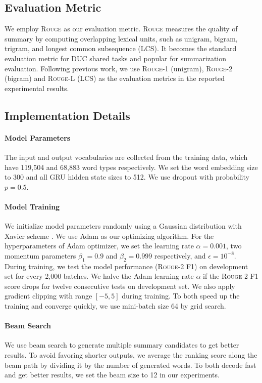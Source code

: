 \documentclass[11pt,a4paper]{article}
\begin{document}
\subsection{Evaluation Metric}
We employ \textsc{Rouge} \citep{lin2004rouge} as our evaluation metric.
\textsc{Rouge} measures the quality of summary by computing overlapping lexical units, such as unigram, bigram, trigram, and longest common subsequence (LCS).
It becomes the standard evaluation metric for DUC shared tasks and popular for summarization evaluation.
Following previous work, we use \textsc{Rouge}-1 (unigram), \textsc{Rouge}-2 (bigram) and \textsc{Rouge}-L (LCS) as the evaluation metrics in the reported experimental results.



\subsection{Implementation Details}

\paragraph{Model Parameters}
The input and output vocabularies are collected from the training data, which have 119,504 and 68,883 word types respectively.
We set the word embedding size to 300 and all GRU hidden state sizes to 512.
We use dropout \citep{srivastava2014dropout} with probability $ p = 0.5 $.


\paragraph{Model Training}
We initialize model parameters randomly using a Gaussian distribution with Xavier scheme \citep{glorot2010understanding}.
We use Adam \citep{kingma2014adam} as our optimizing algorithm.
For the hyperparameters of Adam optimizer, we set the learning rate $ \alpha = 0.001 $, two momentum parameters $ \beta_{1} = 0.9 $ and $ \beta_{2} = 0.999 $ respectively, and $ \epsilon=10^{-8} $.
During training, we test the model performance (\textsc{Rouge}-2 F1) on development set for every 2,000 batches.
We halve the Adam learning rate $ \alpha $ if the \textsc{Rouge}-2 F1 score drops for twelve consecutive tests on development set.
We also apply gradient clipping \citep{pascanu2013difficulty} with range $ [-5, 5] $ during training.
To both speed up the training and converge quickly, we use mini-batch size 64 by grid search.


\paragraph{Beam Search}
We use beam search to generate multiple summary candidates to get better results.
To avoid favoring shorter outputs, we average the ranking score along the beam path by dividing it by the number of generated words.
To both decode fast and get better results, we set the beam size to 12 in our experiments.
\end{document}
